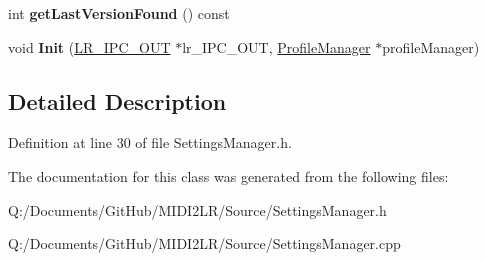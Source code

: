 \begin{DoxyCompactItemize}
\item 
int {\bfseries get\+Last\+Version\+Found} () const \hypertarget{class_settings_manager_ae5a55056fadea3ec3a015149ed5949a5}{}\label{class_settings_manager_ae5a55056fadea3ec3a015149ed5949a5}

\item 
void {\bfseries Init} (\hyperlink{class_l_r___i_p_c___o_u_t}{L\+R\+\_\+\+I\+P\+C\+\_\+\+O\+UT} $\ast$lr\+\_\+\+I\+P\+C\+\_\+\+O\+UT, \hyperlink{class_profile_manager}{Profile\+Manager} $\ast$profile\+Manager)\hypertarget{class_settings_manager_a126ecea64142a954b31c4fe2144a28c8}{}\label{class_settings_manager_a126ecea64142a954b31c4fe2144a28c8}

\end{DoxyCompactItemize}


\subsection{Detailed Description}


Definition at line 30 of file Settings\+Manager.\+h.



The documentation for this class was generated from the following files\+:\begin{DoxyCompactItemize}
\item 
Q\+:/\+Documents/\+Git\+Hub/\+M\+I\+D\+I2\+L\+R/\+Source/Settings\+Manager.\+h\item 
Q\+:/\+Documents/\+Git\+Hub/\+M\+I\+D\+I2\+L\+R/\+Source/Settings\+Manager.\+cpp\end{DoxyCompactItemize}
